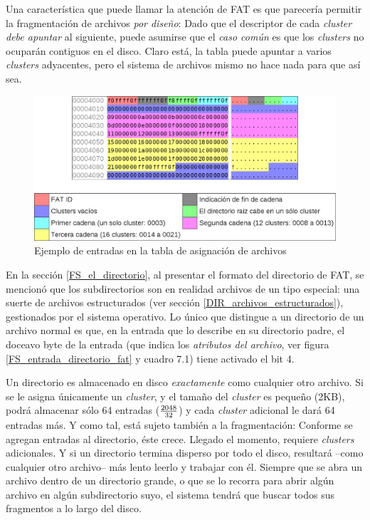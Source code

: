 \documentclass[11pt,fleqn]{book} %
\begin{document}
Una característica que puede llamar la atención de FAT es que
parecería permitir la fragmentación de archivos \emph{por diseño}: Dado que
el descriptor de cada \emph{cluster} \emph{debe apuntar} al siguiente, puede
asumirse que el \emph{caso común} es que los \emph{clusters} no ocuparán contiguos
en el disco. Claro está, la tabla puede apuntar a varios \emph{clusters}
adyacentes, pero el sistema de archivos mismo no hace nada para que
así sea.

\begin{figure}[htb]
\centering
\includegraphics[width=\textwidth]{../img/tabla_fat.png}
\caption{\label{FS_tabla_fat}Ejemplo de entradas en la tabla de asignación de archivos}
\end{figure}

En la sección \ref{FS_el_directorio}, al presentar el formato del
directorio de FAT, se mencionó que los subdirectorios son en realidad
archivos de un tipo especial: una suerte de archivos estructurados
(ver sección \ref{DIR_archivos_estructurados}), gestionados por el
sistema operativo. Lo único que distingue a un directorio de un
archivo normal es que, en la entrada que lo describe en su directorio
padre, el doceavo byte de la entrada (que indica los \emph{atributos del archivo}, ver figura \ref{FS_entrada_directorio_fat} y cuadro
7.1) tiene activado el bit 4.

Un directorio es almacenado en disco \emph{exactamente} como cualquier otro
archivo. Si se le asigna únicamente un \emph{cluster}, y el tamaño del
\emph{cluster} es pequeño (2KB), podrá almacenar sólo 64 entradas ($2048
\over 32$) y cada
\emph{cluster} adicional le dará 64 entradas más. Y como tal, está sujeto
también a la fragmentación: Conforme se agregan entradas al
directorio, éste crece. Llegado el momento, requiere \emph{clusters}
adicionales. Y si un directorio termina disperso por todo el disco,
resultará –como cualquier otro archivo– más lento leerlo y trabajar
con él. Siempre que se abra un archivo dentro de un directorio grande,
o que se lo recorra para abrir algún archivo en algún subdirectorio
suyo, el sistema tendrá que buscar todos sus fragmentos a lo largo del
disco.
\end{document}
